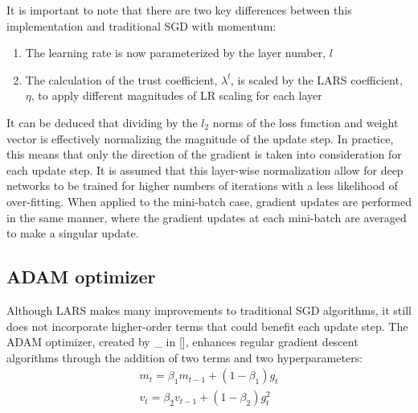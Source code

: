 
It is important to note that there are two key differences between this implementation and traditional SGD with momentum:
\begin{enumerate}
    \item The learning rate is now parameterized by the layer number, $l$
    \item The calculation of the trust coefficient, $\lambda^l$, is scaled by the LARS coefficient, $\eta$, to apply different magnitudes of LR scaling for each layer
\end{enumerate}
\vspace{4pt}

It can be deduced that dividing by the $l_2$ norms of the loss function and weight vector is effectively normalizing the magnitude of the update step. In practice, this means that only the direction of the gradient is taken into consideration for each update step. It is assumed that this layer-wise normalization allow for deep networks to be trained for higher numbers of iterations with a less likelihood of over-fitting. When applied to the mini-batch case, gradient updates are performed in the same manner, where the gradient updates at each mini-batch are averaged to make a singular update. 

\subsection{ADAM optimizer}
Although LARS makes many improvements to traditional SGD algorithms, it still does not incorporate higher-order terms that could benefit each update step. The ADAM optimizer, created by \_ in [], enhances regular gradient descent algorithms through the addition of two terms and two hyperparameters:
\vspace{-10pt}
\begin{align*}
m_{t} = \beta_{1}m_{t-1}+(1-\beta_{1})g_{t} \\
v_{t} = \beta_{2}v_{t-1}+(1-\beta_{2})g_{t}^2
\end{align*}

